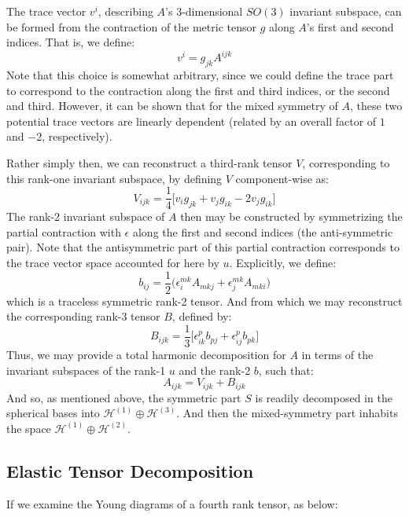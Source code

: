 \documentclass[10pt,a4paper]{article}
\begin{document}
The trace vector $v^i$, describing $A$'s 3-dimensional $SO(3)$ invariant subspace, can be formed from the contraction of the metric tensor $g$ along $A$'s first and second indices. That is, we define:
$$
v^i =g_{jk}A^{ijk}
$$
Note that this choice is somewhat arbitrary, since we could define the trace part to correspond to the contraction along the first and third indices, or the second and third. However, it can be shown that for the mixed symmetry of $A$, these two potential trace vectors are linearly dependent (related by an overall factor of $1$ and $-2$, respectively).

Rather simply then, we can reconstruct a third-rank tensor $V$, corresponding to this rank-one invariant subspace, by defining $V$ component-wise as:
$$
V_{ijk} =\frac{1}{4}\big[v_i g_{jk}+ v_j g_{ik} - 2 v_j g_{ik}\big]
$$
The rank-2 invariant subspace of $A$ then may be constructed by symmetrizing the partial contraction with $\epsilon$ along the first and second indices (the anti-symmetric pair). Note that the antisymmetric part of this partial contraction corresponds to the trace vector space accounted for here by $u$. Explicitly, we define:
$$
b_{ij}=\frac{1}{2}\big(\epsilon_{i}^{mk}A_{mkj}+\epsilon_{j}^{mk}A_{mki}\big)
$$
which is a traceless symmetric rank-2 tensor. And from which we may reconstruct the corresponding rank-3 tensor $B$, defined by:
$$
B_{ijk}=\frac{1}{3}\big[ \epsilon_{ik}^p b_{pj}+\epsilon_{ij}^p b_{pk}\big]
$$
Thus, we may provide a total harmonic decomposition for $A$ in terms of the invariant subspaces of the rank-1 $u$ and the rank-2 $b$, such that:
$$
A_{ijk} = V_{ijk} + B_{ijk}
$$
And so, as mentioned above, the symmetric part $S$ is readily decomposed in the spherical bases into $\mathcal{H}^{(1)}\oplus \mathcal{H}^{(3)}$. And then the mixed-symmetry part inhabits the space $\mathcal{H}^{(1)}\oplus \mathcal{H}^{(2)}$.


\subsection{Elastic Tensor Decomposition}

If we examine the Young diagrams of a fourth rank tensor, as below: 
\end{document}
